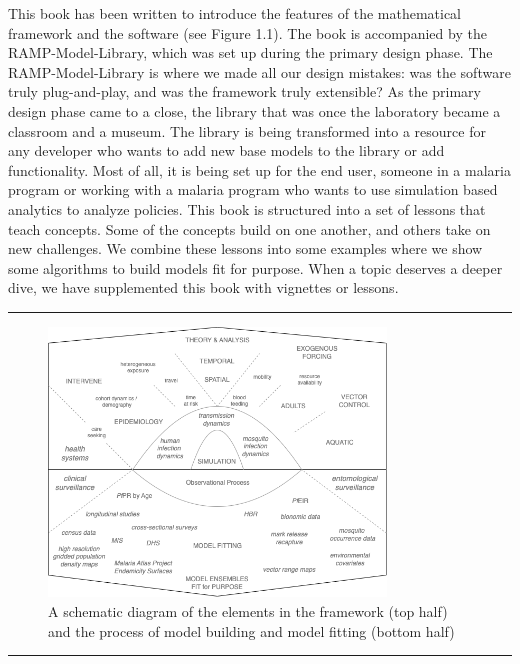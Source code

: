 \documentclass[
]{book}
\begin{document}
This book has been written to introduce the features of the mathematical framework and the software (see Figure 1.1). The book is accompanied by the RAMP-Model-Library, which was set up during the primary design phase. The RAMP-Model-Library is where we made all our design mistakes: was the software truly plug-and-play, and was the framework truly extensible? As the primary design phase came to a close, the library that was once the laboratory became a classroom and a museum. The library is being transformed into a resource for any developer who wants to add new base models to the library or add functionality. Most of all, it is being set up for the end user, someone in a malaria program or working with a malaria program who wants to use simulation based analytics to analyze policies. This book is structured into a set of lessons that teach concepts. Some of the concepts build on one another, and others take on new challenges. We combine these lessons into some examples where we show some algorithms to build models fit for purpose. When a topic deserves a deeper dive, we have supplemented this book with vignettes or lessons.

\begin{center}\rule{0.5\linewidth}{0.5pt}\end{center}

\begin{figure}
\centering
\includegraphics[width=0.8\textwidth,height=\textheight]{Figures/ScalableComplexity.png}
\caption{A schematic diagram of the elements in the framework (top half) and the process of model building and model fitting (bottom half)}
\end{figure}

\begin{center}\rule{0.5\linewidth}{0.5pt}\end{center}
\end{document}
